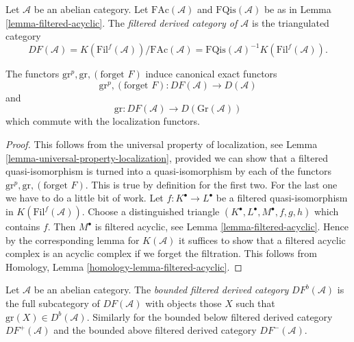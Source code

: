 \begin{definition}
\label{definition-filtered-derived}
Let $\mathcal{A}$ be an abelian category.
Let $\text{FAc}(\mathcal{A})$ and $\text{FQis}(\mathcal{A})$
be as in
Lemma \ref{lemma-filtered-acyclic}.
The {\it filtered derived category of $\mathcal{A}$}
is the triangulated category
$$
DF(\mathcal{A}) =
K(\text{Fil}^f(\mathcal{A}))/\text{FAc}(\mathcal{A}) =
\text{FQis}(\mathcal{A})^{-1} K(\text{Fil}^f(\mathcal{A})).
$$
\end{definition}

\begin{lemma}
\label{lemma-filtered-derived-functors}
The functors $\text{gr}^p, \text{gr}, (\text{forget }F)$ induce
canonical exact functors
$$
\text{gr}^p, (\text{forget }F):
DF(\mathcal{A})
\longrightarrow
D(\mathcal{A})
$$
and
$$
\text{gr}:
DF(\mathcal{A})
\longrightarrow
D(\text{Gr}(\mathcal{A}))
$$
which commute with the localization functors.
\end{lemma}

\begin{proof}
This follows from the universal property of localization, see
Lemma \ref{lemma-universal-property-localization},
provided we can show that a filtered quasi-isomorphism is turned
into a quasi-isomorphism by each of the functors
$\text{gr}^p, \text{gr}, (\text{forget }F)$. This is true by definition
for the first two. For the last one we have to do a little
bit of work. Let $f : K^\bullet \to L^\bullet$ be a filtered
quasi-isomorphism in $K(\text{Fil}^f(\mathcal{A}))$.
Choose a distinguished triangle $(K^\bullet, L^\bullet, M^\bullet, f, g, h)$
which contains $f$. Then $M^\bullet$ is filtered acyclic, see
Lemma \ref{lemma-filtered-acyclic}.
Hence by the corresponding lemma for $K(\mathcal{A})$ it suffices
to show that a filtered acyclic complex is an acyclic complex if
we forget the filtration.
This follows from
Homology, Lemma \ref{homology-lemma-filtered-acyclic}.
\end{proof}

\begin{definition}
\label{definition-filtered-derived-bounded}
Let $\mathcal{A}$ be an abelian category.
The {\it bounded filtered derived category} $DF^b(\mathcal{A})$ is
the full subcategory of $DF(\mathcal{A})$ with objects those $X$
such that $\text{gr}(X) \in D^b(\mathcal{A})$.
Similarly for the bounded below filtered derived category
$DF^{+}(\mathcal{A})$ and the bounded above filtered derived category
$DF^{-}(\mathcal{A})$.
\end{definition}

